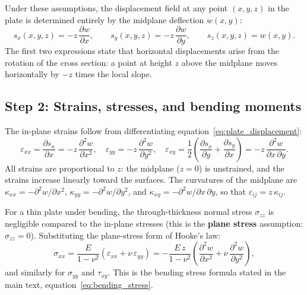 \documentclass[11pt]{article}
\begin{document}
\noindent Under these assumptions, the displacement field at any point $(x,y,z)$ in the plate is determined entirely by the midplane deflection $w(x,y)$:
\begin{equation}
  s_x(x,y,z) = -z\,\frac{\partial w}{\partial x}, \qquad s_y(x,y,z) = -z\,\frac{\partial w}{\partial y}, \qquad s_z(x,y,z) = w(x,y).
  \label{eq:plate_displacement}
\end{equation}
The first two expressions state that horizontal displacements arise from the rotation of the cross section: a point at height $z$ above the midplane moves horizontally by $-z$ times the local slope.

\subsection*{Step 2: Strains, stresses, and bending moments}

The in-plane strains follow from differentiating equation~\eqref{eq:plate_displacement}:
\begin{equation}
  \varepsilon_{xx} = \frac{\partial s_x}{\partial x} = -z\,\frac{\partial^2 w}{\partial x^2}, \quad \varepsilon_{yy} = -z\,\frac{\partial^2 w}{\partial y^2}, \quad \varepsilon_{xy} = \frac{1}{2}\!\left(\frac{\partial s_x}{\partial y} + \frac{\partial s_y}{\partial x}\right) = -z\,\frac{\partial^2 w}{\partial x\,\partial y}.
  \label{eq:plate_strains}
\end{equation}
All strains are proportional to $z$: the midplane ($z = 0$) is unstrained, and the strains increase linearly toward the surfaces.  The curvatures of the midplane are $\kappa_{xx} = -\partial^2 w/\partial x^2$, $\kappa_{yy} = -\partial^2 w/\partial y^2$, and $\kappa_{xy} = -\partial^2 w/\partial x\,\partial y$, so that $\varepsilon_{ij} = z\,\kappa_{ij}$.

\medskip
\noindent For a thin plate under bending, the through-thickness normal stress $\sigma_{zz}$ is negligible compared to the in-plane stresses (this is the \textbf{plane stress} assumption: $\sigma_{zz} = 0$).  Substituting the plane-stress form of Hooke's law:
\begin{equation}
  \sigma_{xx} = \frac{E}{1-\nu^2}\!\left(\varepsilon_{xx} + \nu\,\varepsilon_{yy}\right) = -\frac{E\,z}{1-\nu^2}\!\left(\frac{\partial^2 w}{\partial x^2} + \nu\,\frac{\partial^2 w}{\partial y^2}\right),
  \label{eq:plate_sigma_xx}
\end{equation}
and similarly for $\sigma_{yy}$ and $\tau_{xy}$.  This is the bending stress formula stated in the main text, equation~\eqref{eq:bending_stress}.
\end{document}
